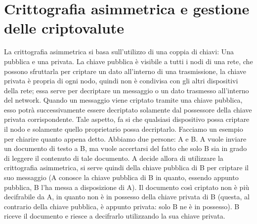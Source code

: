 \section{Crittografia asimmetrica e gestione delle criptovalute}
La crittografia asimmetrica si basa sull'utilizzo di una coppia di chiavi: Una pubblica e una privata. La chiave pubblica è visibile a tutti i nodi di una rete, che possono sfruttarla per criptare un dato all'interno di una trasmissione, la chiave privata è propria di ogni nodo, quindi non è condivisa con gli altri dispositivi della rete; essa serve per decriptare un messaggio o un dato trasmesso all'interno del network. Quando un messaggio viene criptato tramite una chiave pubblica, esso potrà successivamente essere decriptato solamente dal possessore della chiave privata corrispondente. Tale aspetto, fa si che qualsiasi dispositivo possa criptare il nodo e solamente quello proprietario possa decriptarlo. Facciamo un esempio per chiarire quanto appena detto. Abbiamo due persone: A e B. A vuole inviare un documento di testo a B, ma vuole accertarsi del fatto che solo B sia in grado di leggere il contenuto di tale documento. A decide allora di utilizzare la crittografia asimmetrica, si serve quindi della chiave pubblica di B per criptare il suo messaggio (A conosce la chiave pubblica di B in quanto, essendo appunto pubblica, B l'ha messa a disposizione di A). Il documento così criptato non è più decifrabile da A, in quanto non è in possesso della chiave privata di B (questa, al contrario della chiave pubblica, è appunto privata: solo B ne è in possesso). B riceve il documento e riesce a decifrarlo utilizzando la sua chiave privata. 


